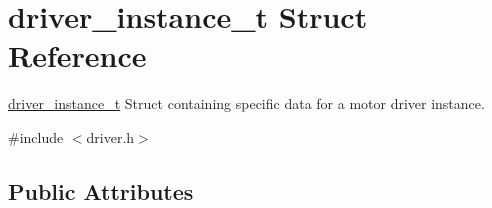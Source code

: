 \hypertarget{structdriver__instance__t}{\section{driver\-\_\-instance\-\_\-t Struct Reference}
\label{structdriver__instance__t}
}


\hyperlink{structdriver__instance__t}{driver\-\_\-instance\-\_\-t} Struct containing specific data for a motor driver instance.  




{\ttfamily \#include $<$driver.\-h$>$}

\subsection*{Public Attributes}
